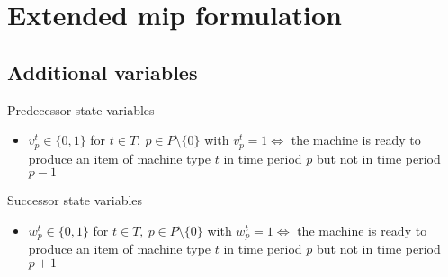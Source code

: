 \documentclass{beamer}
\begin{document}
\section{Extended mip formulation}
\subsection{Additional variables}

\begin{frame}{Predecessor state variables}
  \begin{itemize}
  \item $v^t_p \in \{0,1\}$ for $t \in T,~p \in P \setminus \{0\}$
    with $v^t_p = 1 \Leftrightarrow$ the machine is ready to produce
    an item of machine type $t$ in time period $p$ but not in time
    period $p-1$
  \end{itemize}
\end{frame}

\begin{frame}{Successor state variables}
  \begin{itemize}
  \item $w^t_p \in \{0,1\}$ for $t \in T,~p \in P \setminus \{0\}$
    with $w^t_p = 1 \Leftrightarrow$ the machine is ready to produce
    an item of machine type $t$ in time period $p$ but not in time
    period $p+1$
  \end{itemize}
\end{frame}
\end{document}
